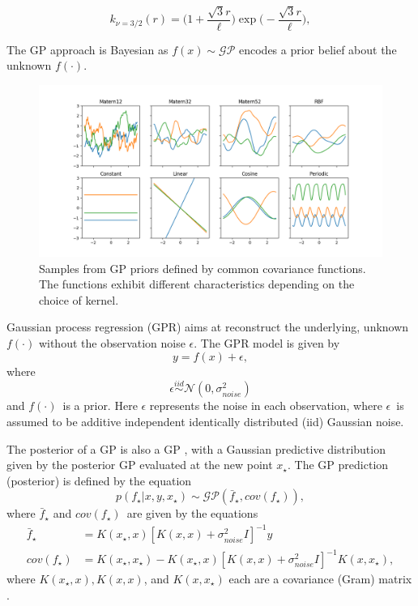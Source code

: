 \begin{equation} \label{eq:matern32}
    k_{\nu=3/2}(r) = \Big(1+\frac{\sqrt{3}r}{\ell}\Big)\exp{\Big(-\frac{\sqrt{3}r}{\ell}\Big)},
\end{equation}

The GP approach is Bayesian as \(f(x) \sim \mathcal{GP}\) encodes a prior belief about the unknown $f(\cdot)$.

\begin{figure} [t!]
    \centering
    \includegraphics[width=\textwidth]{figures/gp_kernels}
    \caption[Samples from GP priors defined by common covariance functions]
    {\small Samples from GP priors defined by common covariance functions. 
    The functions exhibit different characteristics depending on the choice of kernel.}
    \label{fig:gp-kernels}
\end{figure}

Gaussian process regression (GPR) aims at reconstruct the underlying, unknown $f(\cdot)$ without the observation noise $\epsilon$.
The GPR model is given by
\begin{equation}
    y = f(x) + \epsilon,
\end{equation}
where
\[\epsilon \overset{iid}{\sim} \mathcal{N}(0, \sigma_{noise}^2)\]
and $f(\cdot)$ is a prior.
Here $\epsilon$ represents the noise in each observation, where $\epsilon$ is assumed to be additive independent identically distributed (iid) Gaussian noise.

The posterior of a GP is also a GP \cite{Rasmussen2006}, with a Gaussian predictive distribution given by the posterior GP evaluated at the new point $x_\star$.
The GP prediction (posterior) is defined by the equation
\begin{equation}
    p(f_\star|x, y, x_\star) \sim \mathcal{GP}(\bar{f}_\star, cov(f_\star)),
\end{equation}
where $\bar{f}_\star$ and $cov(f_\star)$ are given by the equations
\begin{align}
    \bar{f}_\star &= K(x_\star, x)[K(x, x) + \sigma^2_{noise}I]^{-1}y \\
    cov(f_\star) &= K(x_\star, x_\star) - K(x_\star, x)[K(x, x) + \sigma^2_{noise}I]^{-1}K(x,x_\star),
\end{align}
where $K(x_\star, x), K(x, x)$, and $K(x, x_\star)$ each are a covariance (Gram) matrix \cite{Rasmussen2006}.  

